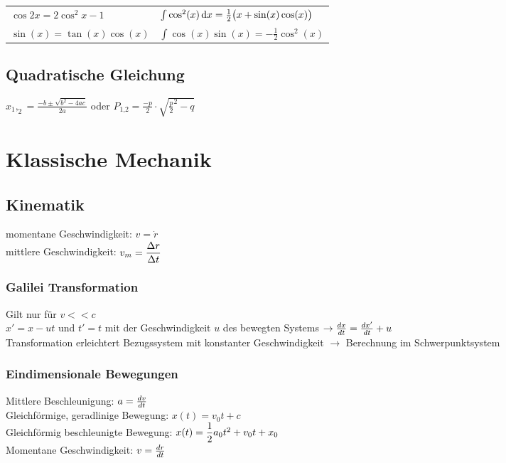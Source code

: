\documentclass[fs, footer]{latex4ei}
\begin{document}
\begin{multicols*}{4}
\begin{tabular}{l  l}
 	$\cos 2x = 2\cos^2 x - 1$  & $\int \cos^2(x) \diff x = \frac12 \bigl(x + \sin(x)\cos(x) \bigr)$\\

 	$\sin(x) = \tan(x)\cos(x)$ & $\int \cos(x)\sin(x) = -\frac12 \cos^2(x)$ \\
\end{tabular}
\fi

\subsection{Quadratische Gleichung}
$x_1,_2 = \frac{-b \pm \sqrt{b^2 - 4ac}}{2a}$ oder $P_{\text{1,2}} = \frac{-p}{2}\cdot\sqrt{\frac{p}{2}^2 - q}$\\




\section{Klassische Mechanik}



\subsection{Kinematik}
momentane Geschwindigkeit: $v = \dot r$\\
mittlere Geschwindigkeit: $v_m = \dfrac{\Delta r}{\Delta t}$\\
\subsubsection{Galilei Transformation}
Gilt nur für $v<<c$\\
$x' = x - ut$ und $t' = t$ mit der Geschwindigkeit $u$ des bewegten Systems $\rightarrow \frac{dx}{dt} = \frac{dx'}{dt} + u$\\
Transformation erleichtert Bezugssystem mit konstanter Geschwindigkeit
$\rightarrow$ Berechnung im Schwerpunktsystem
\subsubsection{Eindimensionale Bewegungen}
Mittlere Beschleunigung: $a = \frac{dv}{dt}$\\
Gleichförmige, geradlinige Bewegung: $x(t) = v_0t+c$\\
Gleichförmig beschleunigte Bewegung: $x(t) = \dfrac{1}{2}a_0t^2+v_0t+x_0$\\
Momentane Geschwindigkeit: $v = \frac{dr}{dt}$\\

\end{multicols*}
\end{document}

